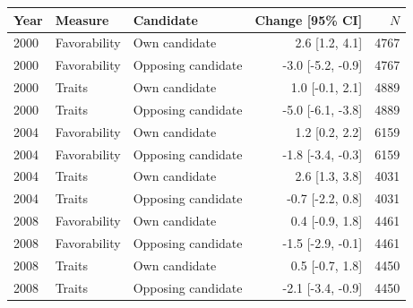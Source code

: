 \begin{tabular}{lllrr}
\toprule
Year & Measure & Candidate & Change [95\% CI] & $N$ \\
\midrule
2000 & Favorability & Own candidate & 2.6 [1.2, 4.1] & 4767 \\
2000 & Favorability & Opposing candidate & -3.0 [-5.2, -0.9] & 4767 \\
2000 & Traits & Own candidate & 1.0 [-0.1, 2.1] & 4889 \\
2000 & Traits & Opposing candidate & -5.0 [-6.1, -3.8] & 4889 \\
2004 & Favorability & Own candidate & 1.2 [0.2, 2.2] & 6159 \\
2004 & Favorability & Opposing candidate & -1.8 [-3.4, -0.3] & 6159 \\
2004 & Traits & Own candidate & 2.6 [1.3, 3.8] & 4031 \\
2004 & Traits & Opposing candidate & -0.7 [-2.2, 0.8] & 4031 \\
2008 & Favorability & Own candidate & 0.4 [-0.9, 1.8] & 4461 \\
2008 & Favorability & Opposing candidate & -1.5 [-2.9, -0.1] & 4461 \\
2008 & Traits & Own candidate & 0.5 [-0.7, 1.8] & 4450 \\
2008 & Traits & Opposing candidate & -2.1 [-3.4, -0.9] & 4450 \\
\bottomrule
\end{tabular}
